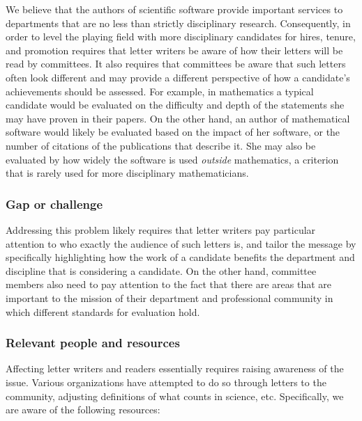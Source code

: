 We believe that the authors of scientific software provide important
services to departments that are no less than strictly disciplinary
research. Consequently, in order to level the playing field with more
disciplinary candidates for hires, tenure, and promotion requires that
letter writers be aware of how their letters will be read by
committees. It also requires that committees be aware that such
letters often look different and may provide a different perspective
of how a candidate's achievements should be assessed. For example, in
mathematics a typical candidate would be evaluated on the difficulty
and depth of the statements she may have proven in their papers. On
the other hand, an author of mathematical software would likely be
evaluated based on the impact of her software, or the number of citations of
the publications that describe it. She may also be evaluated by how
widely the software is used \textit{outside} mathematics, a criterion
that is rarely used for more disciplinary mathematicians.

\subsubsection{Gap or challenge}

Addressing this problem likely requires that letter writers pay
particular attention to who exactly the audience of such letters is,
and tailor the message by specifically highlighting how the work of a
candidate benefits the department and discipline that is considering a
candidate. On the other hand, committee members also need to pay
attention to the fact that there are areas that are important to the mission of
their department and professional community in which different
standards for evaluation hold.


\subsubsection{Relevant people and resources}

Affecting letter writers and readers essentially requires raising
awareness of the issue. Various organizations have attempted to do so
through letters to the community, adjusting definitions of what counts
in science, etc. Specifically, we are aware of the following
resources:

